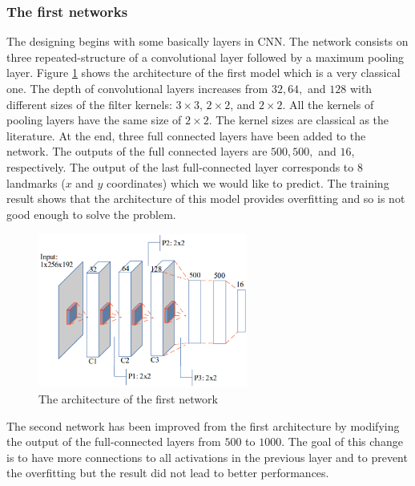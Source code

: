 \documentclass{article} %
\begin{document}
\begin{multicols}{2}
\subsubsection{The first networks}
The designing begins with some basically layers in CNN. The network consists on three repeated-structure of a convolutional layer followed by a maximum pooling layer. Figure \ref{figarch0} shows the architecture of the first model which is a very classical one. The depth of convolutional layers increases from $32, 64,$ and $128$ with different sizes of the filter kernels: $3 \times 3$, $2 \times 2$, and $2 \times 2$. All the kernels of pooling layers have the same size of $2 \times 2$. The kernel sizes are classical as the literature. At the end, three full connected layers have been added to the network. The outputs of the full connected layers are $500, 500,$ and $16$, respectively. The output of the last full-connected layer corresponds to 8 landmarks ($x$ and $y$ coordinates) which we would like to predict. The training result shows that the architecture of this model provides overfitting and so is not good enough to solve the problem.

\begin{figure}[H]
	\centerline{\includegraphics[height=2in]{images/architecture1.eps}}
	\caption{\footnotesize{The architecture of the first network}}
	\label{figarch0}
\end{figure}

The second network has been improved from the first architecture by modifying the output of the full-connected layers from $500$ to $1000$. The goal of this change is to have more connections to all activations in the previous layer and to prevent the overfitting but the result did not lead to better performances.


\end{multicols}
\end{document}

